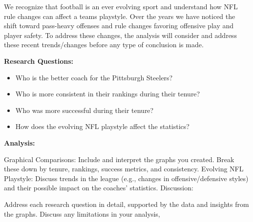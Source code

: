 \documentclass[
  letterpaper,
  DIV=11,
  numbers=noendperiod]{scrartcl}
\begin{document}
We recognize that football is an ever evolving sport and understand how
NFL rule changes can affect a teams playstyle. Over the years we have
noticed the shift toward pass-heavy offenses and rule changes favoring
offensive play and player safety. To address these changes, the analysis
will consider and address these recent trends/changes before any type of
conclusion is made.

\textbf{Research Questions:}

\begin{itemize}
\item
  Who is the better coach for the Pittsburgh Steelers?
\item
  Who is more consistent in their rankings during their tenure?
\item
  Who was more successful during their tenure?
\item
  How does the evolving NFL playstyle affect the statistics?
\end{itemize}

\textbf{Analysis:}

Graphical Comparisons: Include and interpret the graphs you created.
Break these down by tenure, rankings, success metrics, and consistency.
Evolving NFL Playstyle: Discuss trends in the league (e.g., changes in
offensive/defensive styles) and their possible impact on the coaches'
statistics. Discussion:

Address each research question in detail, supported by the data and
insights from the graphs. Discuss any limitations in your analysis,
\end{document}
